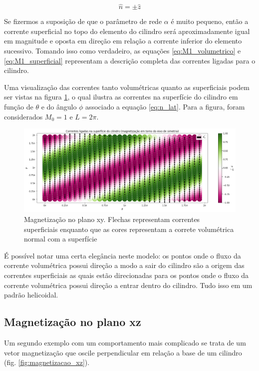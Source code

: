 \documentclass[a4paper, 12pt, twocolumn]{article}
\begin{document}
\begin{equation} \label{eq:n_topo}
	\hat{n} = \pm \hat{z}
\end{equation}

Se fizermos a suposição de que o parâmetro de rede $\alpha$ é muito pequeno, então a corrente superficial no topo do elemento do cilindro será aproximadamente igual em magnitude e oposta em direção em relação a corrente inferior do elemento sucessivo. Tomando isso como verdadeiro, as equações \ref{eq:M1_volumetrico} e \ref{eq:M1_superficial} representam a descrição completa das correntes ligadas para o cilindro.

Uma visualização das correntes tanto volumétricas quanto as superficiais podem ser vistas na figura \ref{fig:helimagneto1}, o qual ilustra as correntes na superfície do cilindro em função de $\theta$ e do ângulo $\phi$ associado a equação \ref{eq:n_lat}. Para a figura, foram considerados $M_0 = 1$ e $L=2\pi$.

\begin{figure}
    \caption{Magnetização no plano xy. Flechas representam correntes superficiais enquanto que as cores representam a correte volumétrica normal com a superfície}
    \label{fig:helimagneto1}
    \centering
    \includegraphics[width=1\textwidth]{helimagneto1.png}
\end{figure}

É possível notar uma certa elegância neste modelo: os pontos onde o fluxo da corrente volumétrica possui direção a modo a sair do cilindro são a origem das correntes superficiais as quais estão direcionadas para os pontos onde o fluxo da corrente volumétrica possui direção a entrar dentro do cilindro. Tudo isso em um padrão helicoidal.

\subsection{Magnetização no plano xz}

Um segundo exemplo com um comportamento mais complicado se trata de um vetor magnetização que oscile perpendicular em relação a base de um cilindro (fig. \ref{fig:magnetizacao_xz}).
\end{document}
